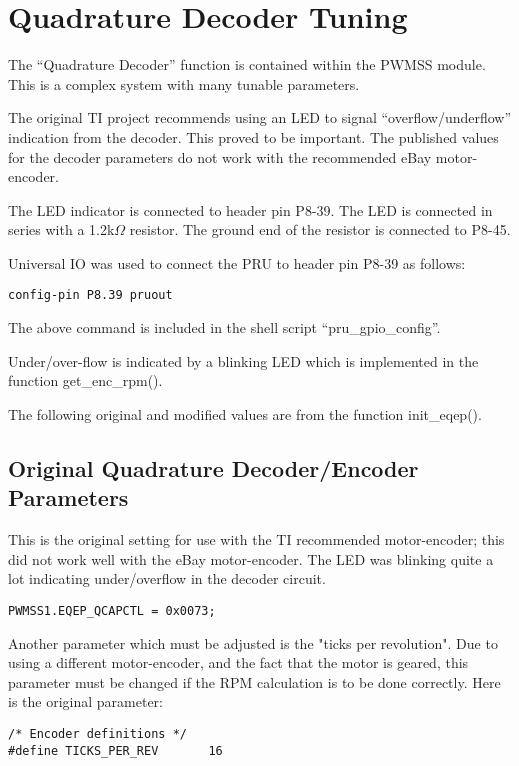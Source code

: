 \section{Quadrature Decoder Tuning}

The ``Quadrature Decoder'' function is contained within the PWMSS module.  This is a complex system with many tunable parameters.

The original TI project recommends using an LED to signal ``overflow/underflow'' indication from the decoder.  This proved to be important.  The published values for the decoder parameters do not work with the recommended eBay motor-encoder.

The LED indicator is connected to header pin P8-39.  The LED is connected in series with a 1.2k$\Omega$ resistor.  The ground end of the resistor is connected to P8-45.

Universal IO was used to connect the PRU to header pin P8-39 as follows:

\begin{verbatim}
config-pin P8.39 pruout
\end{verbatim}

The above command is included in the shell script ``pru\_gpio\_config''.

Under/over-flow is indicated by a blinking LED which is implemented in the function get\_enc\_rpm().

The following original and modified values are from the function init\_eqep().

\subsection{Original Quadrature Decoder/Encoder Parameters}

This is the original setting for use with the TI recommended motor-encoder; this did not work well with the eBay motor-encoder.  The LED was blinking quite a lot indicating under/overflow in the decoder circuit.

\begin{verbatim}
PWMSS1.EQEP_QCAPCTL = 0x0073;
\end{verbatim}

Another parameter which must be adjusted is the "ticks per revolution".  Due to using a different motor-encoder, and the fact that the motor is geared, this parameter must be changed if the RPM calculation is to be done correctly.  Here is the original parameter:

\begin{verbatim}
/* Encoder definitions */
#define TICKS_PER_REV       16
\end{verbatim}

